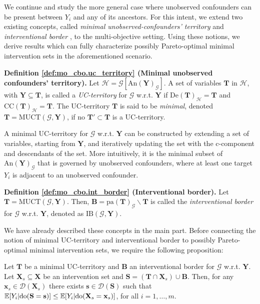 We continue and study the more general case where unobserved confounders can be present between $Y_i$ and any of its ancestors. For this intent, we extend two existing concepts, called \textit{minimal unobserved-confounders’ territory} and \textit{interventional border} \citep{NEURIPS2018_c0a271bc}, to the multi-objective setting. Using these notions, we derive results which can fully characterize possibly Pareto-optimal minimal intervention sets in the aforementioned scenario.

\textbf{Definition \ref{def:mo_cbo.uc_territory} \textnormal{(Minimal unobserved confounders' territory)}.}
Let $\mathcal{H}=\mathcal{G}[\text{An}(\mathbf{Y})_{\mathcal{G}}]$. A set of variables $\mathbf{T}$ in $\mathcal{H}$, with $\mathbf{Y} \subseteq \mathbf{T}$, is called a \textit{UC-territory} for $\mathcal{G}$ w.r.t. $\mathbf{Y}$ if $\text{De}(\mathbf{T})_{\mathcal{H}}=\mathbf{T}$ and $\text{CC}(\mathbf{T})_{\mathcal{H}} = \mathbf{T}$. The UC-territory $\mathbf{T}$ is said to be \textit{minimal}, denoted $\mathbf{T} = \text{MUCT}(\mathcal{G},\mathbf{Y})$, if no $\mathbf{T}' \subset \mathbf{T}$ is a UC-territory.

A minimal UC-territory for $\mathcal{G}$ w.r.t. $\mathbf{Y}$ can be constructed by extending a set of variables, starting from $\mathbf{Y}$, and iteratively updating the set with the c-component and descendants of the set. More intuitively, it is the minimal subset of $\text{An}(\mathbf{Y})_{\mathcal{G}}$ that is governed by unobserved confounders, where at least one target $Y_i$ is adjacent to an unobserved confounder.

\textbf{Definition \ref{def:mo_cbo.int_border} \textnormal{(Interventional border)}.}
Let $\mathbf{T}=\text{MUCT}(\mathcal{G},\mathbf{Y})$. Then, $\mathbf{B} = \text{pa}(\mathbf{T})_{\mathcal{G}} \backslash \mathbf{T}$ is called the \textit{interventional border} for $\mathcal{G}$ w.r.t. $\mathbf{Y}$, denoted as $\text{IB}(\mathcal{G},\mathbf{Y})$.

We have already described these concepts in the main part. Before connecting the notion of minimal UC-territory and interventional border to possibly Pareto-optimal minimal intervention sets, we require the following proposition:

\begin{proposition}
    \label{prop:causal_bandits.subsumption}
    Let $\mathbf{T}$ be a minimal UC-territory and $\mathbf{B}$ an interventional border for $\mathcal{G}$ w.r.t. $\mathbf{Y}$. Let $\mathbf{X}_s \subseteq \mathbf{X}$ be an intervention set and $\mathbf{S} = (\mathbf{T} \cap \mathbf{X}_s) \cup \mathbf{B}$. Then, for any $\mathbf{x}_s \in \mathcal{D}(\mathbf{X}_s)$ there exists $\mathbf{s} \in \mathcal{D}(\mathbf{S})$ such that $\mathbb{E}[Y_i | \textnormal{do}(\mathbf{S}=\mathbf{s})] \leq \mathbb{E}[Y_i | \textnormal{do}(\mathbf{X}_s=\mathbf{x}_s)]$, for all $i=1,\dots,m$.
\end{proposition}

